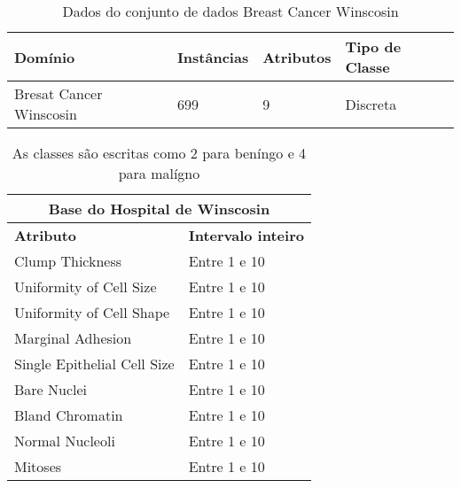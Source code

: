 
\begin{table}[h]
  \begin{center}
    \begin{tabular}{ l | l | l | l}
      \hline
      Domínio & Instâncias & Atributos & Tipo de Classe \\ \hline
      Bresat Cancer Winscosin & 699 & 9 & Discreta \\ \hline
    \end{tabular}
    \caption[Dados do domínio]{Dados do conjunto de dados Breast Cancer Winscosin\cite{donator:92}}
    \label{table:dataset}
  \end{center}
\end{table}

\begin{table}
  \begin{center}
    \begin{tabular}{ l | l }
      \hline
      \multicolumn{2}{c}{ \bfseries Base do Hospital de Winscosin} \\ \hline
      \bfseries Atributo & \bfseries Intervalo inteiro\\ \hline
      Clump Thickness & Entre 1 e 10 \\
      Uniformity of Cell Size & Entre 1 e 10 \\
      Uniformity of Cell Shape & Entre 1 e 10 \\
      Marginal Adhesion & Entre 1 e 10 \\
      Single Epithelial Cell Size & Entre 1 e 10 \\
      Bare Nuclei & Entre 1 e 10 \\
      Bland Chromatin & Entre 1 e 10 \\
      Normal Nucleoli & Entre 1 e 10 \\
      Mitoses & Entre 1 e 10 \\
      \hline
    \end{tabular}
  \end{center}
  \caption{ As classes são escritas como 2 para beníngo e 4 para malígno}
  \label{table:disposicao-atributos}
\end{table}

